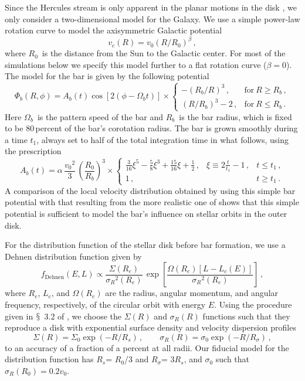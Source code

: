 \documentclass[12pt,preprint]{aastex}
\newcommand{\eg}{e.g.}
\newcommand{\sectionname}{$\mathsection$}
\newcommand{\vo}{\ensuremath{v_0}}
\newcommand{\Ro}{\ensuremath{R_0}}
\newcommand{\Ab}{\ensuremath{A_b}}
\newcommand{\Rb}{\ensuremath{R_b}}
\newcommand{\Omegab}{\ensuremath{\Omega_b}}
\newcommand{\fdehnen}{\ensuremath{f_{\text{Dehnen}}}}
\newcommand{\sigmaR}{\ensuremath{\sigma_R}}
\newcommand{\rE}{\ensuremath{R_e}}
\newcommand{\Lc}{\ensuremath{L_c}}
\newcommand{\Rs}{\ensuremath{R_s}}
\newcommand{\Rsigma}{\ensuremath{R_{\sigma}}}
\begin{document}
Since the Hercules stream is only apparent in the planar motions in
the disk \citep[\eg,][]{Bovy09a}, we only consider a two-dimensional
model for the Galaxy. We use a simple power-law rotation curve to
model the axisymmetric Galactic potential
\begin{equation}
v_c(R) = \vo(R/\Ro)^\beta \,,
\end{equation}
where \Ro\ is the distance from the Sun to the Galactic center. For
most of the simulations below we specify this model further to a flat
rotation curve ($\beta = 0$). The model for the bar is given by the
following potential
\begin{equation}
\Phi_b(R,\phi) = \Ab(t) \cos [2(\phi - \Omegab t)] \times
\left\{ \begin{array}{ll} -(\Rb/R)^3\,, & \mathrm{for}\ R \geq
  \Rb\,,\\ (R/\Rb)^3-2\,, & \mathrm{for}\ R \leq \Rb\,. \end{array}
\right.
\end{equation}
Here \Omegab\ is the pattern speed of the bar and \Rb\ is the bar
radius, which is fixed to be 80\,percent of the bar's corotation
radius. The bar is grown smoothly during a time $t_1$, always set to
half of the total integration time in what follows, using the
prescription
\begin{equation}
\Ab(t) = \alpha \, \frac{\vo^2}{3}\,\left(\frac{\Ro}{\Rb}\right)^3
\times \left\{ \begin{array}{lll}
\frac{3}{16}\xi^5 - \frac{5}{8} \xi^3 + \frac{15}{16} \xi + \frac{1}{2}\,, & \xi \equiv 2\frac{t}{t_1}-1\,, & t \leq t_1\,,\\
1\,, & & t \geq t_1\,.\end{array} \right. 
\end{equation}
A comparison of the local velocity distribution obtained by using this
simple bar potential with that resulting from the more realistic one
of \citet{gardner10a} shows that this simple potential is sufficient
to model the bar's influence on stellar orbits in the outer disk.

For the distribution function of the stellar disk before bar
formation, we use a Dehnen distribution function \citep{dehnen99b}
given by
\begin{equation}\label{eq:fdehnen}
\fdehnen(E,L) \propto \frac{\Sigma(\rE)}{\sigmaR^2(\rE)} \, \exp\left[ \frac{\Omega(\rE)\left[L-\Lc(E)\right]}{\sigmaR^2(\rE)}\right]\,,
\end{equation}
where \rE, \Lc, and $\Omega(\rE)$ are the radius, angular momentum,
and angular frequency, respectively, of the circular orbit with energy
$E$. Using the procedure given in \sectionname~3.2 of
\citet{dehnen99b}, we choose the $\Sigma(R)$ and $\sigmaR(R)$
functions such that they reproduce a disk with exponential surface
density and velocity dispersion profiles
\begin{equation}
\Sigma(R) = \Sigma_0 \exp\left(-R/\Rs\right)\,, \qquad 
\sigmaR(R) = \sigma_0 \exp\left(-R/\Rsigma\right)\,,
\end{equation}
to an accuracy of a fraction of a percent at all radii. Our fiducial
model for the distribution function has \Rs = \Ro /3 and \Rsigma =
3\Rs, and $\sigma_0$ such that $\sigmaR(\Ro) = 0.2 \vo$.
\end{document}
